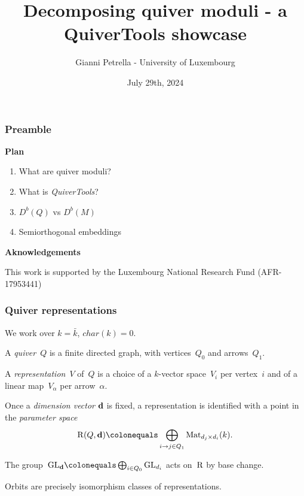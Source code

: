 \documentclass{beamer}
\title{Decomposing quiver moduli - a QuiverTools showcase}
\author{Gianni Petrella - University of Luxembourg}
\institute{MEGA 2024 - MPI MIS Leipzig}
\date{July 29th, 2024}
\begin{document}
\begin{frame}
    \titlepage
\end{frame}

\begin{frame}
    \frametitle{Preamble}
\textbf{Plan}
\begin{enumerate}
    \item What are quiver moduli?
    \item What is \emph{QuiverTools}?
    \item $D^b(Q)$ vs $D^b(M)$
    \item Semiorthogonal embeddings
\end{enumerate} \pause
\vfill
\textbf{Aknowledgements}

This work is supported by the Luxembourg National Research Fund (AFR-17953441)

\end{frame}

\begin{frame}
    \frametitle{Quiver representations}
\begin{definition}
    We work over $k = \bar{k}$, $char(k) = 0$. \pause

    A \emph{quiver}~$Q$ is a finite directed graph, with
    vertices~$Q_0$ and arrows~$Q_1$.

    A \emph{representation}~$V$ of~$Q$ is
    a choice of a $k$-vector space~$V_i$ per vertex~$i$
    and of a linear map~$V_{\alpha}$ per arrow~$\alpha$.
\end{definition} \pause

Once a \emph{dimension vector} $\mathbf{d}$ is fixed, a representation
is identified with a point in the \emph{parameter space}
\[
    \parameterspace(Q, \tuple{d})
    \colonequals \bigoplus_{i \to j \in Q_1}
    \Mat_{d_j \times d_i}(k).
\] \pause

The group~${\GL}_{\tuple{d}} \colonequals \bigoplus_{i \in Q_0} \GL_{d_i}$
acts on~$\operatorname{R}$ by base change. \pause

Orbits are precisely isomorphism classes of representations.
\end{frame}
\end{document}
